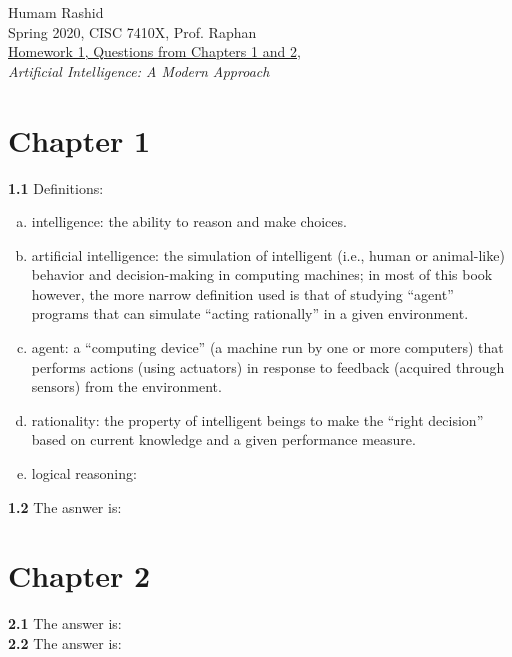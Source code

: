 \documentclass{scrartcl}
\begin{document}
\begin{flushleft}
Humam Rashid\\
Spring 2020, CISC 7410X, Prof. Raphan\\
\underline{Homework 1, Questions from Chapters 1 and 2,}\\
\textit{Artificial Intelligence: A Modern Approach}
\end{flushleft}

\section*{Chapter 1}
\textbf{1.1} Definitions:
\begin{enumerate}[(a)]
    \item intelligence: the ability to reason and make choices.
    \item artificial intelligence: the simulation of intelligent (i.e., human or animal-like)
        behavior and decision-making in computing machines; in most of this book however, the more
        narrow definition used is that of studying ``agent'' programs that can simulate
        ``acting rationally'' in a given environment.
    \item agent: a ``computing device'' (a machine run by one or more computers) that performs
        actions (using actuators) in response to feedback (acquired through sensors) from the
        environment.
    \item rationality: the property of intelligent beings to make the ``right decision'' based on
        current knowledge and a given performance measure.
    \item logical reasoning:
\end{enumerate}
\textbf{1.2} The asnwer is:

\section*{Chapter 2}
\textbf{2.1} The answer is:
\\
\textbf{2.2} The answer is:
\end{document}
